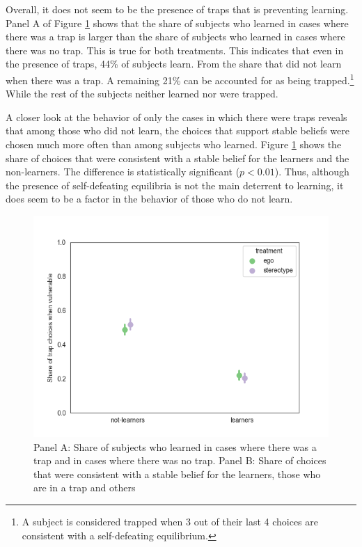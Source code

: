 \documentclass[
  12pt,
]{article}
\begin{document}
Overall, it does not seem to be the presence of traps that is preventing
learning. Panel A of Figure \ref{fig:traps-choice} shows that the share
of subjects who learned in cases where there was a trap is larger than
the share of subjects who learned in cases where there was no trap. This
is true for both treatments. This indicates that even in the presence of
traps, 44\% of subjects learn. From the share that did not learn when
there was a trap. A remaining 21\% can be accounted for as being
trapped.\footnote{A subject is considered trapped when 3 out of their last 4 choices are consistent with 
a self-defeating equilibrium.} While the rest of the subjects neither
learned nor were trapped.

A closer look at the behavior of only the cases in which there were
traps reveals that among those who did not learn, the choices that
support stable beliefs were chosen much more often than among subjects
who learned. Figure \ref{fig:traps-choice} shows the share of choices
that were consistent with a stable belief for the learners and the
non-learners. The difference is statistically significant (\(p<0.01\)).
Thus, although the presence of self-defeating equilibria is not the main
deterrent to learning, it does seem to be a factor in the behavior of
those who do not learn.

\begin{figure}
\hypertarget{fig:traps-choice}{%
\centering
\includegraphics{../figures/trap_choice.png}
\caption{Panel A: Share of subjects who learned in cases where there was
a trap and in cases where there was no trap. Panel B: Share of choices
that were consistent with a stable belief for the learners, those who
are in a trap and others}\label{fig:traps-choice}
}
\end{figure}
\end{document}

